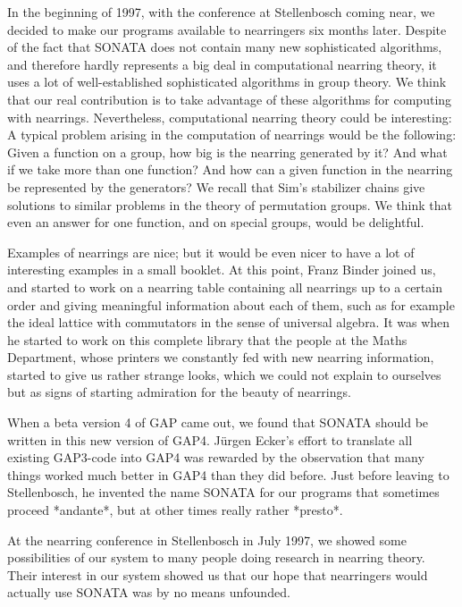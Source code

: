 In the beginning of 1997, with the conference at Stellenbosch coming near,
we decided to make our programs available to nearringers
six months later. Despite of the fact that SONATA does not 
contain many new sophisticated algorithms, and therefore hardly
represents a big deal in computational nearring theory,
it uses a lot of well-established sophisticated algorithms in group theory.
We think that our real contribution is to take advantage of 
these algorithms for computing with nearrings.
Nevertheless, computational nearring theory could be interesting:
A typical problem arising in the computation of nearrings would 
be the following: Given a function on a group, how big
is the nearring generated by it? And what if we take more
than one function? And how can a given function in the 
nearring be represented by the generators? We recall
that Sim's stabilizer chains give solutions to similar
problems in the theory of permutation groups.
We think that even an answer for one function, and on special
groups,  would be delightful.

Examples of nearrings are nice; but it would be even nicer to have 
a lot of interesting examples in a small booklet. At this
point, Franz Binder joined us, and started to work on 
 a nearring table containing all nearrings up to a certain order
and giving meaningful information about each of them, such
as for example the ideal lattice with commutators in the sense
of universal algebra. 
It was when he started to work on this complete library that
the people at the Maths Department, whose printers
 we constantly fed with new nearring information, started
to give us rather strange looks, which we could not explain to
ourselves 
but as signs of starting admiration for the beauty of nearrings.

When a beta version 4 of GAP came out, we found that SONATA
should be written in this new version of GAP4. J\"urgen Ecker's
effort to translate all existing GAP3-code into GAP4 
was rewarded by the observation that many things worked much
better in GAP4 than they did before.
Just before leaving to Stellenbosch, he invented the name 
SONATA for our programs that sometimes proceed *andante*, but
at other times really rather *presto*. 

At the nearring conference in Stellenbosch in July 1997, we
showed some possibilities of our system to many people doing research in
nearring theory. Their interest in our system showed us 
that our hope that nearringers would actually use SONATA
was by no means unfounded. 

